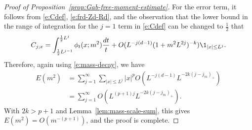 \begin{proof}[Proof of Proposition~\ref{prop:Gab-free-moment-estimate}]
For the error term,
it follows from
\eqref{e:Cdef}, \eqref{e:frd-Zd-Rd},
and the observation that the lower bound in the range of integration for the $j=1$ term in \eqref{e:Cdef}
can be changed to $\frac12$ that
\begin{equation}
\label{e:frd-integral-approx}
C_{j;x}
=
\int_{\frac{1}{2} L^{j-1}}^{\frac{1}{2} L^j} \phi_t(x; m^2) \frac{dt}{t}
+
O(L^{-j (d - 1)} (1 + m^2 L^{2j})^{-k})
\1_{|x|\leq L^j}.
\end{equation}
Therefore, again using \eqref{e:mass-decay}, we have
\begin{align}
E(m^2)
&= \sum_{j=1}^\infty \sum_{|x|\leq L^j} |x|^p O(L^{-j (d - 1)}
L^{-2k(j-j_m)_+})
\\
&= \sum_{j=1}^\infty O(L^{(p+1)j}L^{-2k(j-j_m)_+})
\label{e:free-error-estimate}
.
\end{align}
With $2k>p+1$ and Lemma~\ref{lem:mass-scale-sum}, this gives
$E(m^2) = O(m^{-(p+1)})$,
and the proof is complete.
\end{proof}